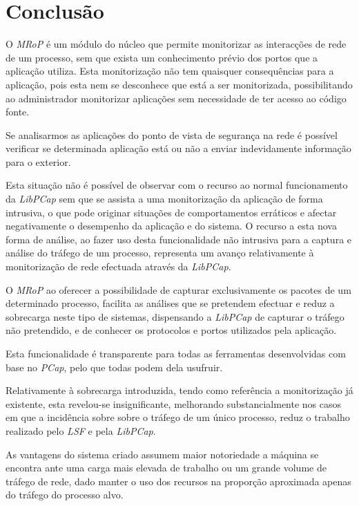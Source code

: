 \chapter{Conclusão}
\label{cap:conclusao}

O \textit{MRoP} é um módulo do núcleo que permite monitorizar as interacções de rede de um processo, sem que exista um conhecimento prévio dos portos que a aplicação utiliza.
Esta monitorização não tem quaisquer consequências para a aplicação, pois esta nem se desconhece que está a ser monitorizada, possibilitando ao administrador monitorizar aplicações sem necessidade de ter acesso ao código fonte.

Se analisarmos as aplicações do ponto de vista de segurança na rede é possível verificar se determinada aplicação está ou não a enviar indevidamente informação para o exterior.

Esta situação não é possível de observar com o recurso ao normal funcionamento da \textit{LibPCap} sem que se assista a uma monitorização da aplicação de forma intrusiva, o que pode originar situações de comportamentos erráticos e afectar negativamente o desempenho da aplicação e do sistema.
O recurso a esta nova forma de análise, ao fazer uso desta funcionalidade não intrusiva para a captura e análise do tráfego de um processo, representa um avanço relativamente à monitorização de rede efectuada através da \textit{LibPCap}.

O \textit{MRoP} ao oferecer a possibilidade de capturar exclusivamente os pacotes de um determinado processo, facilita as análises que se pretendem efectuar e reduz a sobrecarga neste tipo de sistemas, dispensando a \textit{LibPCap} de capturar o tráfego não pretendido, e de conhecer os protocolos e portos utilizados pela aplicação.


Esta funcionalidade é transparente para todas as ferramentas desenvolvidas com base no \textit{PCap}, pelo que todas podem dela usufruir.

Relativamente à sobrecarga introduzida, tendo como referência a monitorização já existente, esta revelou-se insignificante, melhorando substancialmente nos casos em que a incidência sobre sobre o tráfego de um único processo, reduz o trabalho realizado pelo \textit{LSF} e pela \textit{LibPCap}.

As vantagens do sistema criado assumem maior notoriedade a máquina se encontra ante uma carga mais elevada de trabalho ou um grande volume de tráfego de rede, dado manter o uso dos recursos na proporção aproximada apenas do tráfego do processo alvo.


